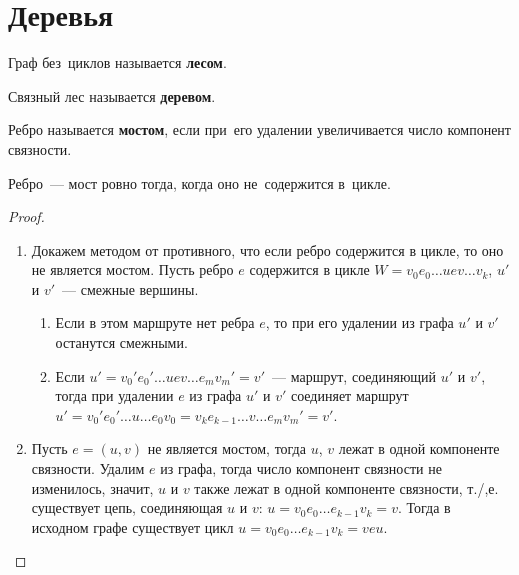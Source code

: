 \section{Деревья}
Граф без~циклов называется \textbf{лесом}.

Связный лес называется \textbf{деревом}.

Ребро называется \textbf{мостом}, если при~его удалении увеличивается число компонент связности.

\begin{statement}
Ребро~--- мост ровно тогда, когда оно не~содержится в~цикле.
\end{statement}
\begin{proof}
\begin{enumerate}
	\item Докажем методом от противного, что если ребро содержится в цикле, то оно не является мостом. Пусть ребро $e$ содержится в цикле $W = v_0 e_0 \ldots u e v \ldots v_k$, $u'$ и $v'$~--- смежные вершины.
	\begin{enumerate}
		\item Если в этом маршруте нет ребра $e$, то при его удалении из графа $u'$ и $v'$ останутся смежными.
		\item Если $u' = v_0' e_0' \ldots u e v \ldots e_m v_m' = v'$~--- маршрут, соединяющий $u'$ и $v'$, тогда при удалении $e$ из графа $u'$ и $v'$ соединяет маршрут $u' = v_0' e_0' \ldots u \ldots e_0 v_0 = v_k e_{k-1} \ldots v \ldots e_m v_m' = v'$.
	\end{enumerate}
	\item Пусть $e = (u, v)$ не является мостом, тогда $u$, $v$ лежат в одной компоненте связности. Удалим $e$ из графа, тогда число компонент связности не изменилось, значит, $u$ и $v$ также лежат в одной компоненте связности, т./,е. существует цепь, соединяющая $u$ и $v$: $u = v_0 e_0 \ldots e_{k-1} v_k = v$. Тогда в исходном графе существует цикл $u = v_0 e_0 \ldots e_{k-1} v_k = v e u$.
\end{enumerate}
\end{proof}

